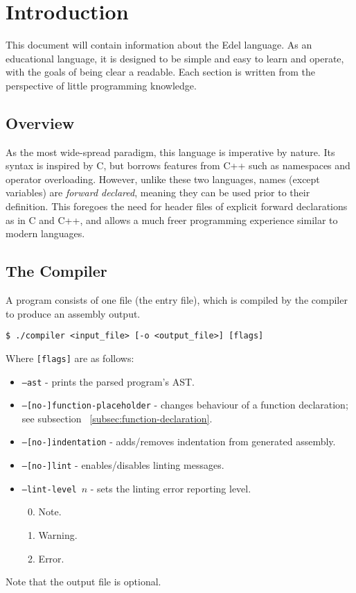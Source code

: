 \section{Introduction}\label{sec:introduction}

This document will contain information about the Edel language.
As an educational language, it is designed to be simple and easy to learn and operate, with the goals of being clear a readable.
Each section is written from the perspective of little programming knowledge.

\subsection{Overview}\label{subsec:overview}

As the most wide-spread paradigm, this language is imperative by nature.
Its syntax is inspired by C, but borrows features from C++ such as namespaces and operator overloading.
However, unlike these two languages, names (except variables) are \textit{forward declared}, meaning they can be used prior to their definition.
This foregoes the need for header files of explicit forward declarations as in C and C++, and allows a much freer programming experience similar to modern languages.


\subsection{The Compiler}\label{subsec:the-compiler}

A program consists of one file (the entry file), which is compiled by the compiler to produce an assembly output.

\medskip
\begin{lstlisting}[style=bashconsole]
$ ./compiler <input_file> [-o <output_file>] [flags]
\end{lstlisting}
\medskip

Where \texttt{[flags]} are as follows:
\begin{itemize}
    \item \texttt{--ast} - prints the parsed program's AST.
    \item \texttt{--[no-]function-placeholder} - changes behaviour of a function declaration; see subsection ~\ref{subsec:function-declaration}.
    \item \texttt{--[no-]indentation} - adds/removes indentation from generated assembly.
    \item \texttt{--[no-]lint} - enables/disables linting messages.
    \item \texttt{--lint-level \(n\)} - sets the linting error reporting level.
    \begin{enumerate} \setcounter{enumi}{-1}
        \item Note.
        \item Warning.
        \item Error.
    \end{enumerate}
\end{itemize}
Note that the output file is optional.

